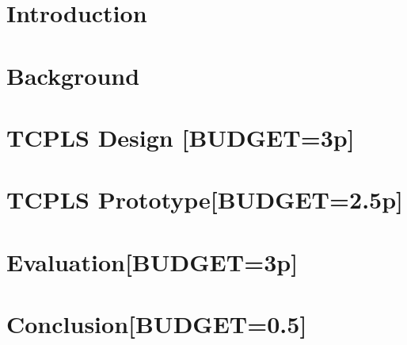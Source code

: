 \section{Introduction}
\label{sec:intro}




\section{Background}
\label{sec:background}


\section{TCPLS Design [BUDGET=3p]}
\label{sec:background-design}




\section{TCPLS Prototype[BUDGET=2.5p]}
\label{sec:prototype}



\section{Evaluation[BUDGET=3p]}
\label{sec:evaluation}


\section{Conclusion[BUDGET=0.5]}
\label{sec:conclusion}




%


%


